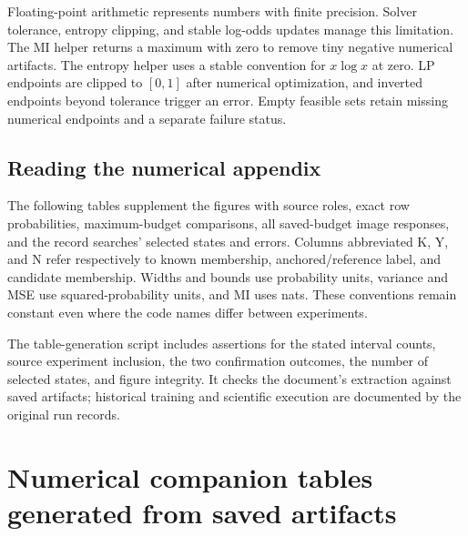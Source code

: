 \documentclass[11pt,a4paper]{report}
\begin{document}
Floating-point arithmetic represents numbers with finite precision. Solver tolerance, entropy clipping, and stable log-odds updates manage this limitation. The MI helper returns a maximum with zero to remove tiny negative numerical artifacts. The entropy helper uses a stable convention for $x\log x$ at zero. LP endpoints are clipped to $[0,1]$ after numerical optimization, and inverted endpoints beyond tolerance trigger an error. Empty feasible sets retain missing numerical endpoints and a separate failure status.

\section{Reading the numerical appendix}
The following tables supplement the figures with source roles, exact row probabilities, maximum-budget comparisons, all saved-budget image responses, and the record searches' selected states and errors. Columns abbreviated K, Y, and N refer respectively to known membership, anchored/reference label, and candidate membership. Widths and bounds use probability units, variance and MSE use squared-probability units, and MI uses nats. These conventions remain constant even where the code names differ between experiments.

The table-generation script includes assertions for the stated interval counts, source experiment inclusion, the two confirmation outcomes, the number of selected states, and figure integrity. It checks the document's extraction against saved artifacts; historical training and scientific execution are documented by the original run records.

\appendix
\chapter{Numerical companion tables generated from saved artifacts}

\end{document}
